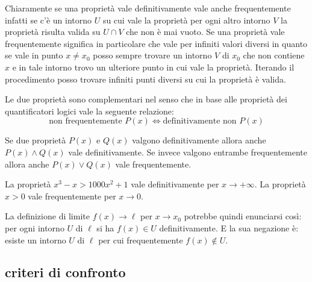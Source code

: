 Chiaramente se una proprietà vale definitivamente vale anche frequentemente
infatti se c'è un intorno $U$ su cui vale la proprietà per ogni altro intorno 
$V$ la proprietà risulta valida su $U\cap V$ che non è mai vuoto.
Se una proprietà vale frequentemente significa in particolare che vale per 
infiniti valori diversi in quanto se vale in punto $x\neq x_0$ 
posso sempre trovare un intorno $V$ di $x_0$ che non contiene $x$
e in tale intorno trovo un ulteriore punto in cui vale la proprietà. 
Iterando il procedimento posso trovare infiniti punti diversi su cui 
la proprietà è valida.

Le due proprietà sono complementari nel senso che
in base alle proprietà dei quantificatori logici vale 
la seguente relazione:
\[
  \text{non frequentemente $P(x)$} \iff
  \text{definitivamente non $P(x)$}
\]

Se due proprietà $P(x)$ e $Q(x)$ valgono definitivamente allora anche
$P(x)\land Q(x)$ vale definitivamente. Se invece valgono entrambe
frequentemente allora anche $P(x) \lor Q(x)$ vale frequentemente.

\begin{example}
La proprietà $x^3 - x > 1000 x^2 + 1$
vale definitivamente per $x\to +\infty$.
La proprietà $x>0$ vale frequentemente per $x\to 0$.
\end{example}


La definizione di limite $f(x) \to \ell$ per $x\to x_0$ 
potrebbe quindi enunciarsi così:
per ogni intorno $U$ di $\ell$ si ha $f(x)\in U$ definitivamente.
E la sua negazione è: esiste un intorno $U$ di $\ell$ per cui
frequentemente $f(x)\not\in U$.


\subsection{criteri di confronto}

